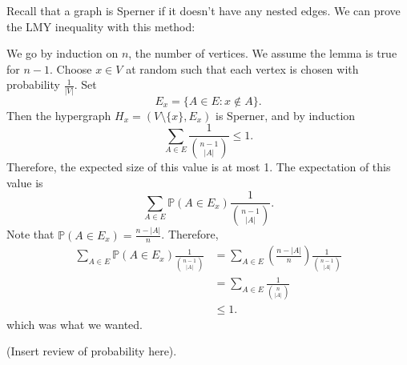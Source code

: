 
Recall that a graph is Sperner if it doesn't have any nested edges. We can prove the LMY inequality with this method:

\begin{replacementproof}
	We go by induction on \( n \), the number of vertices. We assume the lemma is true for \( n-1 \). Choose \( x \in V \) at random such that each vertex is chosen with probability \( \frac{1}{|V|} \). Set \[
		E_x = \{A \in E : x \not\in A\}  
	.\] 
	Then the hypergraph \( H_x = (V \setminus \{x\} , E_x ) \) is Sperner, and by induction \[
		\sum_{A \in E}\frac{1}{\binom{n-1}{|A|}}\le 1
	.\] Therefore, the expected size of this value is at most 1. The expectation of this value is
	\[
		\sum_{A \in E} \mathbb{P}(A \in E_x) \frac{1}{\binom{n-1}{|A|}}
	.\] Note that \( \mathbb{P}(A \in E_x) = \frac{n-|A|}{n}\). Therefore, 
	\begin{align*}
		\sum_{A \in E} \mathbb{P}(A \in E_x) \frac{1}{\binom{n-1}{|A|}} &= \sum_{A \in E}\left( \frac{n-|A|}{n} \right) \frac{1}{\binom{n-1}{|A|}}  \\
		&= \sum_{A \in E} \frac{1}{\binom{n}{|A|}} \\
		&\le 1
	.\end{align*}
	which was what we wanted.
\end{replacementproof}

(Insert review of probability here).
